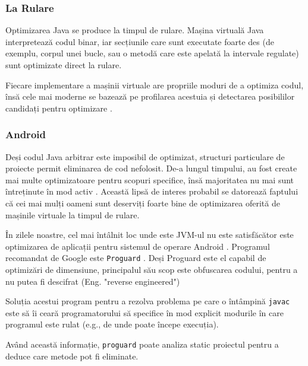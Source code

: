 \subsubsection{La Rulare}

Optimizarea Java se produce la timpul de rulare.  Mașina virtuală Java
interpretează codul binar, iar secțiunile care sunt executate foarte des (de
exemplu, corpul unei bucle, sau o metodă care este apelată la intervale
regulate) sunt optimizate direct la rulare.

Fiecare implementare a mașinii virtuale are propriile moduri de a optimiza
codul, însă cele mai moderne se bazează pe profilarea acestuia și detectarea
posibililor candidați pentru optimizare \cite{arnold2006dynamic}.

\subsubsection{Android}

Deși codul Java arbitrar este imposibil de optimizat, structuri
particulare de proiecte permit eliminarea de cod nefolosit. De-a lungul
timpului, au fost create mai multe optimizatoare pentru scopuri specifice, însă
majoritatea nu mai sunt întreținute în mod activ \cite{java_android_optimizers}.
Această lipsă de interes probabil se datorează faptului că cei mai mulți oameni
sunt deserviți foarte bine de optimizarea oferită de mașinile virtuale la timpul
de rulare.

În zilele noastre, cel mai întâlnit loc unde este JVM-ul nu este satisfăcător
este optimizarea de aplicații pentru sistemul de operare Android
\cite{proguard_google}.
Programul recomandat de Google este \texttt{Proguard} \cite{proguard}.
Deși Proguard este el capabil de optimizări de dimensiune, principalul
său scop este obfuscarea codului, pentru a nu putea fi descifrat (Eng. "reverse
engineered")

Soluția acestui program pentru a rezolva problema pe care o
întâmpină \texttt{javac} este să îi ceară programatorului să
specifice în mod explicit modurile în care programul este rulat
(e.g., de unde poate începe execuția).

Având această informație, \texttt{proguard} poate analiza static
proiectul pentru a deduce care metode pot fi eliminate.

